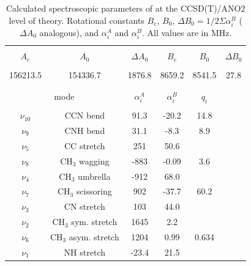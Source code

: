 \newpage

\begin{center}
    \begin{table}[h]
    \caption{Calculated spectroscopic parameters of \pa at the CCSD(T)/ANO2 level of theory. Rotational constants $B_e$, $B_0$, $\Delta B_0=1/2\Sigma \alpha^B_i$ ($\Delta A_0$ analogous), and $\alpha^A_i$ and $\alpha^B_i$. All values are in MHz.}\label{tab:CH3CNH+:tab4}
        \centering
        \begin{tabular}{cccccc}
            \hline\hline\\
            $A_e$    & $A_0$    &  $\Delta A_0$ & $B_e$  & $B_0$  & $\Delta B_0$  \\\hline\\
            156213.5 & 154336.7 & 1876.8        & 8659.2 & 8541.5 & 27.8            \\\\
            \hline\hline\\
            \multicolumn{2}{c}{mode}          & $\alpha^A_i$ & $\alpha ^B_i$ & $q_i$ & \\\hline\\
            $\nu_{10}$ & CCN bend             & 91.3  &  -20.2 & 14.8    &  \\
            $\nu_9$    & CNH bend             & 31.1  &  -8.3  & 8.9     &  \\
            $\nu_5$    & CC stretch           & 251   &  50.6  &         &  \\
            $\nu_8$    & CH$_3$ wagging       & -883  &  -0.09 & 3.6     &  \\
            $\nu_4$    & CH$_3$ umbrella      & -912  &  68.0  &         &  \\
            $\nu_7$    & CH$_3$ scissoring    & 902   &  -37.7 & 60.2    &  \\
            $\nu_3$    & CN stretch & 103     & 44.0  &        &            \\
            $\nu_2$    & CH$_3$ sym. stretch  & 1645  & 2.2    &         &  \\
            $\nu_6$    & CH$_3$ asym. stretch & 1204  & 0.99   & 0.634   &  \\
            $\nu_1$    & NH stretch           & -23.4 & 21.5   &         &  \\
            
            \hline\hline
        \end{tabular}
        \label{rot}
    \end{table}
\end{center}

